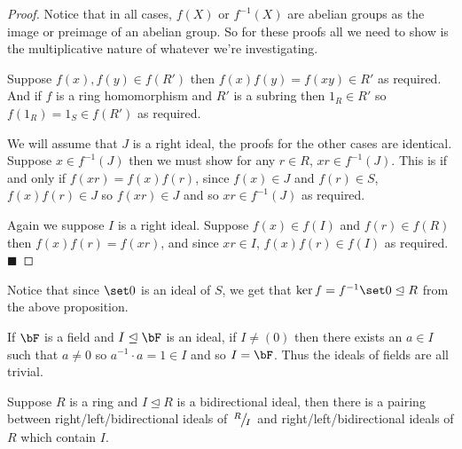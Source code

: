 \documentclass[10pt]{article}
\let\ideal=\trianglelefteq
\def\qed{\hskip1cm\hbox{}\hfill$\blacksquare$}
\begin{document}
\begin{proof}

    Notice that in all cases, $f(X)$ or $f^{-1}(X)$ are abelian groups as the image or preimage of an abelian group.
    So for these proofs all we need to show is the multiplicative nature of whatever we're investigating.
    \benum
        \item Suppose $f(x),f(y)\in f(R')$ then $f(x)f(y)=f(xy)\in R'$ as required.
        And if $f$ is a ring homomorphism and $R'$ is a subring then $1_R\in R'$ so $f(1_R)=1_S\in f(R')$ as required.
        \item We will assume that $J$ is a right ideal, the proofs for the other cases are identical.
        Suppose $x\in f^{-1}(J)$ then we must show for any $r\in R$, $xr\in f^{-1}(J)$.
        This is if and only if $f(xr)=f(x)f(r)$, since $f(x)\in J$ and $f(r)\in S$, $f(x)f(r)\in J$ so $f(xr)\in J$ and so $xr\in f^{-1}(J)$ as required.
        \item Again we suppose $I$ is a right ideal.
        Suppose $f(x)\in f(I)$ and $f(r)\in f(R)$ then $f(x)f(r)=f(xr)$, and since $xr\in I$, $f(x)f(r)\in f(I)$ as required.
        \qed
    \eenum

\end{proof}

Notice that since $\set0$ is an ideal of $S$, we get that $\ker f=f^{-1}\set0\ideal R$ from the above proposition.

\begin{note}

    If $\bF$ is a field and $I\ideal\bF$ is an ideal, if $I\neq(0)$ then there exists an $a\in I$ such that $a\neq0$ so $a^{-1}\cdot a=1\in I$ and so $I=\bF$.
    Thus the ideals of fields are all trivial.

\end{note}

\begin{thrm*}

    Suppose $R$ is a ring and $I\ideal R$ is a bidirectional ideal, then there is a pairing between right/left/bidirectional ideals of $\slfrac RI$ and right/left/bidirectional ideals of $R$ which contain
    $I$.

\end{thrm*}
\end{document}
